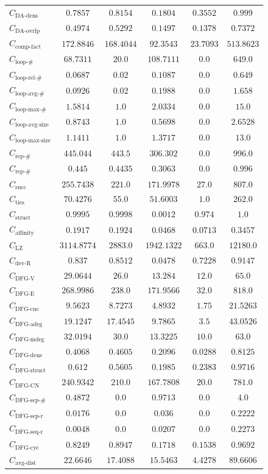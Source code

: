 \documentclass{standalone}
\newcommand{\dadensname}{\text{DA-dens}}
\newcommand{\dadens}{C_{\dadensname}}
\newcommand{\daoverlapname}{\text{DA-ovrlp}}
\newcommand{\daoverlap}{C_{\daoverlapname}}
\newcommand{\complexityfactorname}{\text{comp-fact}}
\newcommand{\complexityfactor}{C_{\complexityfactorname}}
\newcommand{\loopnumname}{\text{loop-\#}}
\newcommand{\loopnum}{C_{\loopnumname}}
\newcommand{\looprelnumname}{\text{loop-rel-\#}}
\newcommand{\looprelnum}{C_{\looprelnumname}}
\newcommand{\loopavgname}{\text{loop-avg-\#}}
\newcommand{\loopavg}{C_{\loopavgname}}
\newcommand{\loopmaxname}{\text{loop-max-\#}}
\newcommand{\loopmax}{C_{\loopmaxname}}
\newcommand{\loopavgsizename}{\text{loop-avg-size}}
\newcommand{\loopavgsize}{C_{\loopavgsizename}}
\newcommand{\loopmaxsizename}{\text{loop-max-size}}
\newcommand{\loopmaxsize}{C_{\loopmaxsizename}}
\newcommand{\repnumname}{\text{rep-\#}}
\newcommand{\repnum}{C_{\repnumname}}
\newcommand{\reprelnum}{C_{\repnumname}}
\newcommand{\dfgnodesname}{\text{DFG-V}}
\newcommand{\dfgnodes}{C_{\dfgnodesname}}
\newcommand{\dfgedgesname}{\text{DFG-E}}
\newcommand{\dfgedges}{C_{\dfgedgesname}}
\newcommand{\dfgcncname}{\text{DFG-cnc}}
\newcommand{\dfgcnc}{C_{\dfgcncname}}
\newcommand{\dfgavgdegname}{\text{DFG-adeg}}
\newcommand{\dfgavgdeg}{C_{\dfgavgdegname}}
\newcommand{\dfgmaxdegname}{\text{DFG-mdeg}}
\newcommand{\dfgmaxdeg}{C_{\dfgmaxdegname}}
\newcommand{\dfgdensname}{\text{DFG-dens}}
\newcommand{\dfgdens}{C_{\dfgdensname}}
\newcommand{\dfgstructname}{\text{DFG-struct}}
\newcommand{\dfgstruct}{C_{\dfgstructname}}
\newcommand{\dfgcycnumbername}{\text{DFG-CN}}
\newcommand{\dfgcycnumber}{C_{\dfgcycnumbername}}
\newcommand{\dfgsepnumname}{\text{DFG-sep-\#}}
\newcommand{\dfgsepnum}{C_{\dfgsepnumname}}
\newcommand{\dfgseprationame}{\text{DFG-sep-r}}
\newcommand{\dfgsepratio}{C_{\dfgseprationame}}
\newcommand{\dfgseqrationame}{\text{DFG-seq-r}}
\newcommand{\dfgseqratio}{C_{\dfgseqrationame}}
\newcommand{\dfgcycname}{\text{DFG-cyc}}
\newcommand{\dfgcyc}{C_{\dfgcycname}}
\newcommand{\numberofneighborhoodsname}{\text{succ}}
\newcommand{\numberofneighborhoods}{C_{\numberofneighborhoodsname}}
\newcommand{\numberoftiesname}{\text{ties}}
\newcommand{\numberofties}{C_{\numberoftiesname}}
\newcommand{\lempelzivname}{\text{LZ}}
\newcommand{\lempelziv}{C_{\lempelzivname}}
\newcommand{\structurename}{\text{struct}}
\newcommand{\structure}{C_{\structurename}}
\newcommand{\affinityname}{\text{affinity}}
\newcommand{\affinity}{C_{\affinityname}}
\newcommand{\deviationfromrandomname}{\text{dev-R}}
\newcommand{\deviationfromrandom}{C_{\deviationfromrandomname}}
\newcommand{\avgdistname}{\text{avg-dist}}
\newcommand{\avgdist}{C_{\avgdistname}}
\begin{document}
\begin{tabular}{lccccc}
$\dadens$ & $0.7857$ & $0.8154$ & $0.1804$ & $0.3552$ & $0.999$ \\ 
$\daoverlap$ & $0.4974$ & $0.5292$ & $0.1497$ & $0.1378$ & $0.7372$ \\ 
$\complexityfactor$ & $172.8846$ & $168.4044$ & $92.3543$ & $23.7093$ & $513.8623$ \\ 
$\loopnum$ & $68.7311$ & $20.0$ & $108.7111$ & $0.0$ & $649.0$ \\ 
$\looprelnum$ & $0.0687$ & $0.02$ & $0.1087$ & $0.0$ & $0.649$ \\ 
$\loopavg$ & $0.0926$ & $0.02$ & $0.1988$ & $0.0$ & $1.658$ \\ 
$\loopmax$ & $1.5814$ & $1.0$ & $2.0334$ & $0.0$ & $15.0$ \\ 
$\loopavgsize$ & $0.8743$ & $1.0$ & $0.5698$ & $0.0$ & $2.6528$ \\ 
$\loopmaxsize$ & $1.1411$ & $1.0$ & $1.3717$ & $0.0$ & $13.0$ \\ 
$\repnum$ & $445.044$ & $443.5$ & $306.302$ & $0.0$ & $996.0$ \\ 
$\reprelnum$ & $0.445$ & $0.4435$ & $0.3063$ & $0.0$ & $0.996$ \\ 
$\numberofneighborhoods$ & $255.7438$ & $221.0$ & $171.9978$ & $27.0$ & $807.0$ \\ 
$\numberofties$ & $70.4276$ & $55.0$ & $51.6003$ & $1.0$ & $262.0$ \\ 
$\structure$ & $0.9995$ & $0.9998$ & $0.0012$ & $0.974$ & $1.0$ \\ 
$\affinity$ & $0.1917$ & $0.1924$ & $0.0468$ & $0.0713$ & $0.3457$ \\ 
$\lempelziv$ & $3114.8774$ & $2883.0$ & $1942.1322$ & $663.0$ & $12180.0$ \\ 
$\deviationfromrandom$ & $0.837$ & $0.8512$ & $0.0478$ & $0.7228$ & $0.9147$ \\ 
$\dfgnodes$ & $29.0644$ & $26.0$ & $13.284$ & $12.0$ & $65.0$ \\ 
$\dfgedges$ & $268.9986$ & $238.0$ & $171.9566$ & $32.0$ & $818.0$ \\ 
$\dfgcnc$ & $9.5623$ & $8.7273$ & $4.8932$ & $1.75$ & $21.5263$ \\ 
$\dfgavgdeg$ & $19.1247$ & $17.4545$ & $9.7865$ & $3.5$ & $43.0526$ \\ 
$\dfgmaxdeg$ & $32.0194$ & $30.0$ & $13.3225$ & $10.0$ & $63.0$ \\ 
$\dfgdens$ & $0.4068$ & $0.4605$ & $0.2096$ & $0.0288$ & $0.8125$ \\ 
$\dfgstruct$ & $0.612$ & $0.5605$ & $0.1985$ & $0.2383$ & $0.9716$ \\ 
$\dfgcycnumber$ & $240.9342$ & $210.0$ & $167.7808$ & $20.0$ & $781.0$ \\ 
$\dfgsepnum$ & $0.4872$ & $0.0$ & $0.9713$ & $0.0$ & $4.0$ \\ 
$\dfgsepratio$ & $0.0176$ & $0.0$ & $0.036$ & $0.0$ & $0.2222$ \\ 
$\dfgseqratio$ & $0.0048$ & $0.0$ & $0.0207$ & $0.0$ & $0.2273$ \\ 
$\dfgcyc$ & $0.8249$ & $0.8947$ & $0.1718$ & $0.1538$ & $0.9692$ \\ 
$\avgdist$ & $22.6646$ & $17.4088$ & $15.5463$ & $4.4278$ & $89.6606$ \\ 
\bottomrule
\end{tabular}
\end{document}
